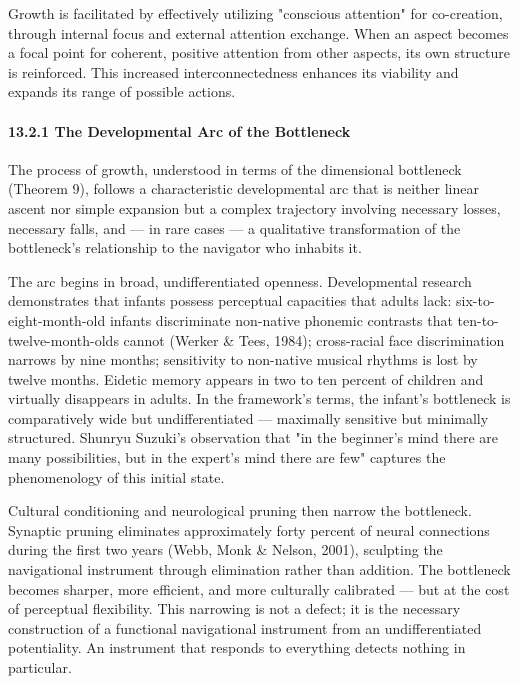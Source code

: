 Growth is facilitated by effectively utilizing "conscious attention" for co-creation, through internal focus and external attention exchange. When an aspect becomes a focal point for coherent, positive attention from other aspects, its own structure is reinforced. This increased interconnectedness enhances its viability and expands its range of possible actions.


\paragraph*{13.2.1 The Developmental Arc of the Bottleneck}


The process of growth, understood in terms of the dimensional bottleneck (Theorem 9), follows a characteristic developmental arc that is neither linear ascent nor simple expansion but a complex trajectory involving necessary losses, necessary falls, and — in rare cases — a qualitative transformation of the bottleneck's relationship to the navigator who inhabits it.


The arc begins in broad, undifferentiated openness. Developmental research demonstrates that infants possess perceptual capacities that adults lack: six-to-eight-month-old infants discriminate non-native phonemic contrasts that ten-to-twelve-month-olds cannot (Werker \& Tees, 1984); cross-racial face discrimination narrows by nine months; sensitivity to non-native musical rhythms is lost by twelve months. Eidetic memory appears in two to ten percent of children and virtually disappears in adults. In the framework's terms, the infant's bottleneck is comparatively wide but undifferentiated — maximally sensitive but minimally structured. Shunryu Suzuki's observation that "in the beginner's mind there are many possibilities, but in the expert's mind there are few" captures the phenomenology of this initial state.


Cultural conditioning and neurological pruning then narrow the bottleneck. Synaptic pruning eliminates approximately forty percent of neural connections during the first two years (Webb, Monk \& Nelson, 2001), sculpting the navigational instrument through elimination rather than addition. The bottleneck becomes sharper, more efficient, and more culturally calibrated — but at the cost of perceptual flexibility. This narrowing is not a defect; it is the necessary construction of a functional navigational instrument from an undifferentiated potentiality. An instrument that responds to everything detects nothing in particular.


